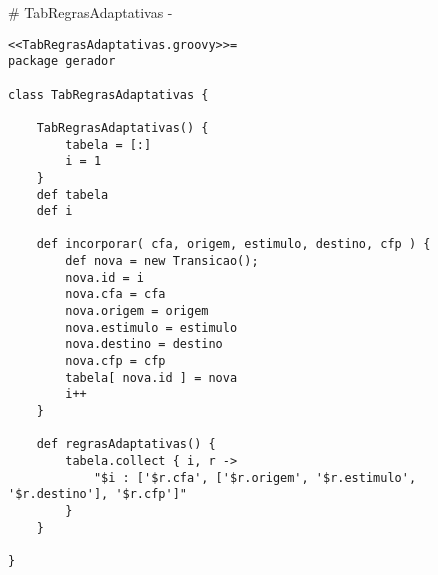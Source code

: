 # TabRegrasAdaptativas {-}

\begin{lstlisting}
<<TabRegrasAdaptativas.groovy>>=
package gerador

class TabRegrasAdaptativas {

    TabRegrasAdaptativas() {
        tabela = [:]
        i = 1
    }
    def tabela
    def i

    def incorporar( cfa, origem, estimulo, destino, cfp ) {
        def nova = new Transicao();
        nova.id = i
        nova.cfa = cfa
        nova.origem = origem
        nova.estimulo = estimulo
        nova.destino = destino
        nova.cfp = cfp
        tabela[ nova.id ] = nova
        i++
    }

    def regrasAdaptativas() {
        tabela.collect { i, r ->
            "$i : ['$r.cfa', ['$r.origem', '$r.estimulo', '$r.destino'], '$r.cfp']"
        }
    }

}



\end{lstlisting}


